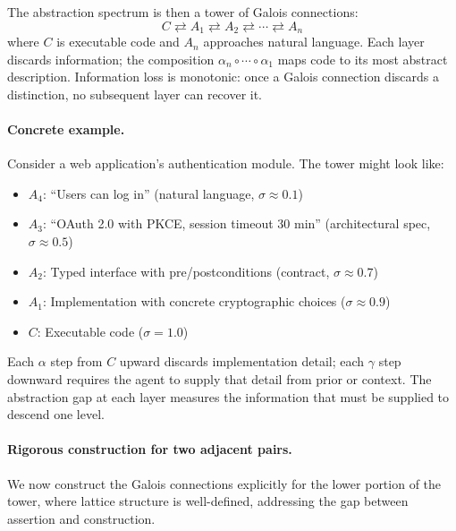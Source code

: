 \documentclass[11pt, a4paper]{googledeepmind}
\begin{document}
The abstraction spectrum is then a tower of Galois connections:
\begin{equation}
    C \rightleftarrows A_1 \rightleftarrows A_2 \rightleftarrows \cdots \rightleftarrows A_n
\end{equation}
where $C$ is executable code and $A_n$ approaches natural language. Each layer discards information; the composition $\alpha_n \circ \cdots \circ \alpha_1$ maps code to its most abstract description. Information loss is monotonic: once a Galois connection discards a distinction, no subsequent layer can recover it.

\paragraph{Concrete example.} Consider a web application's authentication module. The tower might look like:
\begin{itemize}[nosep]
    \item $A_4$: ``Users can log in'' (natural language, $\sigma \approx 0.1$)
    \item $A_3$: ``OAuth 2.0 with PKCE, session timeout 30 min'' (architectural spec, $\sigma \approx 0.5$)
    \item $A_2$: Typed interface with pre/postconditions (contract, $\sigma \approx 0.7$)
    \item $A_1$: Implementation with concrete cryptographic choices ($\sigma \approx 0.9$)
    \item $C$: Executable code ($\sigma = 1.0$)
\end{itemize}
Each $\alpha$ step from $C$ upward discards implementation detail; each $\gamma$ step downward requires the agent to supply that detail from prior or context. The abstraction gap at each layer measures the information that must be supplied to descend one level.

\paragraph{Rigorous construction for two adjacent pairs.}
We now construct the Galois connections explicitly for the lower portion of the tower, where lattice structure is well-defined, addressing the gap between assertion and construction.
\end{document}
